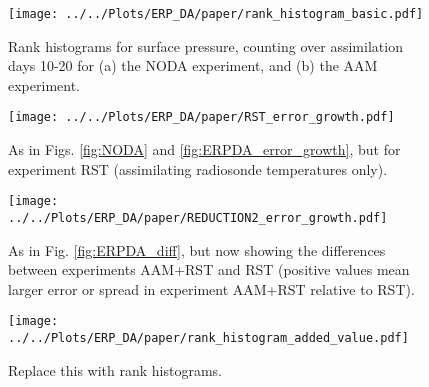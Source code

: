 \begin{figure}
\texttt{[image: ../../Plots/ERP\_DA/paper/rank\_histogram\_basic.pdf]} 
 \caption{\textcolor{alert}{Rank histograms for surface pressure, counting over assimilation days 10-20 for (a) the NODA experiment, and (b) the AAM experiment.}}
 \label{fig:compare_divergence_basic}
\end{figure}

 \begin{figure}
\texttt{[image: ../../Plots/ERP\_DA/paper/RST\_error\_growth.pdf]} 
 \caption{As in Figs. \ref{fig:NODA} and \ref{fig:ERPDA_error_growth}, but for experiment RST (assimilating radiosonde temperatures only).}
 \label{fig:RST}
\end{figure}

 \begin{figure}
\texttt{[image: ../../Plots/ERP\_DA/paper/REDUCTION2\_error\_growth.pdf]} 
 \caption{As in Fig. \ref{fig:ERPDA_diff}, but now showing the differences between experiments AAM+RST and RST (positive values mean larger error or spread in experiment AAM+RST relative to RST).}
 \label{fig:ERPRST_diff}
\end{figure}

\begin{figure}
\texttt{[image: ../../Plots/ERP\_DA/paper/rank\_histogram\_added\_value.pdf]} 
 \caption{\textcolor{alert}{Replace this with rank histograms.}}
 \label{fig:compare_divergence_added_value}
\end{figure}

